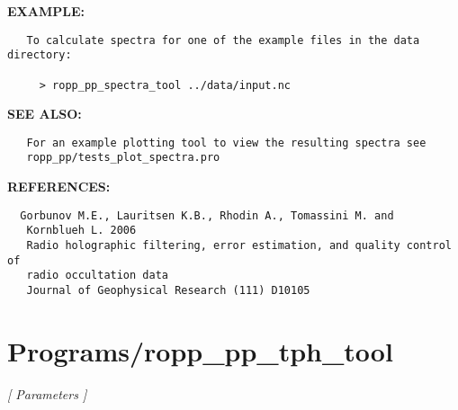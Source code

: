 \textbf{EXAMPLE:}\hspace{0.08in}\begin{Verbatim}
   To calculate spectra for one of the example files in the data directory:

     > ropp_pp_spectra_tool ../data/input.nc
\end{Verbatim}
\textbf{SEE ALSO:}\hspace{0.08in}\begin{Verbatim}
   For an example plotting tool to view the resulting spectra see
   ropp_pp/tests_plot_spectra.pro
\end{Verbatim}
\textbf{REFERENCES:}\hspace{0.08in}\begin{Verbatim}
  Gorbunov M.E., Lauritsen K.B., Rhodin A., Tomassini M. and
   Kornblueh L. 2006
   Radio holographic filtering, error estimation, and quality control of
   radio occultation data
   Journal of Geophysical Research (111) D10105
\end{Verbatim}
\section{Programs/ropp\_pp\_tph\_tool}
\textsl{[ Parameters ]}

